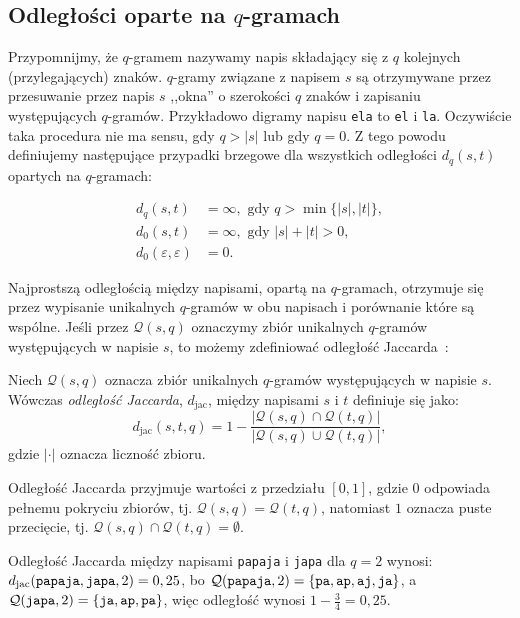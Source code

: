 \documentclass{praca1}
\begin{document}
\subsection{Odległości oparte na $q$-gramach}

Przypomnijmy, że $q$-gramem nazywamy napis składający się z $q$ kolejnych (przylegających) znaków. $q$-gramy związane z napisem $s$ są otrzymywane przez przesuwanie przez napis $s$ ,,okna'' o szerokości $q$ znaków i zapisaniu występujących $q$-gramów. Przykładowo digramy napisu \verb|ela| to \verb|el| i \verb|la|. Oczywiście taka procedura nie ma sensu, gdy $q > |s|$ lub gdy $q = 0$. Z tego powodu definiujemy następujące przypadki brzegowe dla wszystkich odległości $d_q(s,t)$ opartych na $q$-gramach:

\begin{align*}
d_q(s,t) &= \infty, \text{ gdy } q > \min\{|s|, |t|\},\\
d_0(s,t) &= \infty, \text{ gdy } |s| + |t| > 0, \\
d_0(\varepsilon,\varepsilon) &= 0.
\end{align*}

Najprostszą odległością między napisami, opartą na $q$-gramach, otrzymuje się przez wypisanie unikalnych $q$-gramów w obu napisach i porównanie które są wspólne. Jeśli przez $\mathcal{Q}(s,q)$ oznaczymy zbiór unikalnych $q$-gramów występujących w napisie $s$, to możemy zdefiniować odległość Jaccarda~\cite{Loo2014:stringdist}:

\begin{definition}
Niech $\mathcal{Q}(s,q)$ oznacza zbiór unikalnych $q$-gramów występujących w napisie $s$. Wówczas \emph{odległość Jaccarda}, $d_{\mathrm{jac}}$, między napisami $s$ i $t$ definiuje się jako:
\begin{equation*}
d_{\mathrm{jac}}(s,t,q) = 1 - \frac{|\mathcal{Q}(s,q) \cap \mathcal{Q}(t,q)|}{|\mathcal{Q}(s,q) \cup \mathcal{Q}(t,q)|},
\end{equation*}
gdzie $|\cdot|$ oznacza liczność zbioru.
\end{definition} 

Odległość Jaccarda przyjmuje wartości z przedziału $[0,1]$, gdzie $0$ odpowiada pełnemu pokryciu zbiorów, tj. $\mathcal{Q}(s,q) = \mathcal{Q}(t,q)$, natomiast $1$ oznacza puste przecięcie, tj. \hbox{$\mathcal{Q}(s,q) \cap \mathcal{Q}(t,q) = \emptyset$.}

\begin{example}
Odległość Jaccarda między napisami \verb|papaja| i \verb|japa| dla $q = 2$ wynosi: $d_{\mathrm{jac}}(\verb|papaja|, \verb|japa|, 2)  = 0,25$, bo $\mathcal{Q}(\verb|papaja|, 2) = \{\verb|pa|, \verb|ap|, \verb|aj|, \verb|ja|\}$, a $\mathcal{Q}(\verb|japa|, 2) = \{\verb|ja|, \verb|ap|, \verb|pa|\}$, więc odległość wynosi $1 - \frac{3}{4} = 0,25$.
\end{example}
\end{document}

